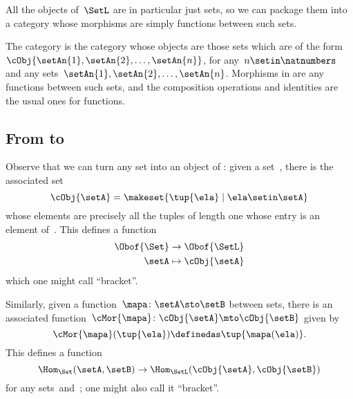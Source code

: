 
All the objects of~$\SetL$ are in particular just sets, so we can package them into a category whose morphisms are simply functions between such sets.

\begin{ctdefinition}[\SetL]\label{def:SetL}
    The category \SetL is the category whose objects are those sets which are of the form~$\cObj{\setAn{1}, \setAn{2}, \ldots, \setAn{n}}$, for any~$n \setin \natnumbers$ and any sets~$\setAn{1}, \setAn{2}, \ldots, \setAn{n}$. Morphisms in \SetL are any functions between such sets, and the composition operations and identities are the usual ones for functions. 
\end{ctdefinition}

    
\subsection{From \Set to~\SetL}

Observe that we can turn any set into an object of \SetL: given a set~\setA, there is the associated set
\begin{equation}
    \label{eq:setintosetl}
    \cObj{\setA} = \makeset{ \tup{\ela} \mid \ela \setin \setA }
\end{equation}
whose elements are precisely all the tuples of length one whose entry is an element of~\setA.
This defines a function
\begin{equation}
    \label{eq:setintosetlfunction}
    \begin{aligned}
        \Obof{\Set} & \to \Obof{\SetL} \\
        \setA       & \mapsto \cObj{\setA}
    \end{aligned}
\end{equation}
which one might call ``bracket''.

Similarly, given a function~$\mapa \colon \setA \sto \setB$ between sets, there is an associated function~$\cMor{ \mapa }\colon \cObj{\setA} \mto \cObj{\setB}$ given by
\begin{equation}
    \label{eq:functionintosetlmor}
    \cMor{ \mapa } ( \tup{\ela }) \definedas \tup{\mapa(\ela)}.
\end{equation}
This defines a function
\begin{equation}
    \label{eq:functionintosetlmorfun}
    \Hom_{\Set}(\setA,\setB) \to \Hom_{\SetL}(\cObj{\setA},\cObj{\setB})
\end{equation}
for any sets~\setA and~\setB; one might also call it ``bracket''.

